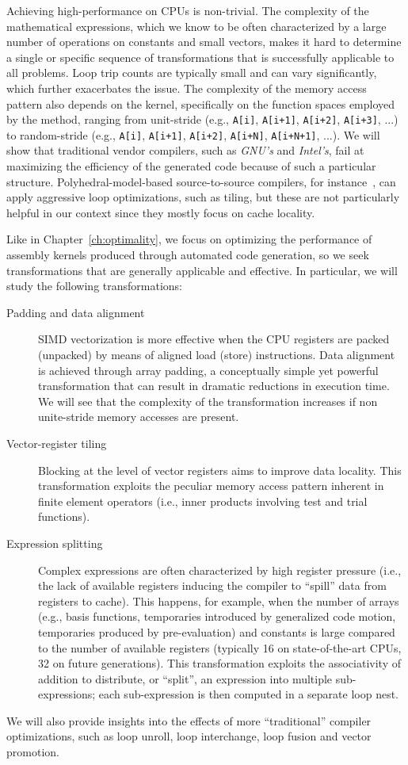 Achieving high-performance on CPUs is non-trivial. The complexity of the mathematical expressions, which we know to be often characterized by a large number of operations on constants and small vectors, makes it hard to determine a single or specific sequence of transformations that is successfully applicable to all problems. Loop trip counts are typically small and can vary significantly, which further exacerbates the issue. The complexity of the memory access pattern also depends on the kernel, specifically on the function spaces employed by the method, ranging from unit-stride (e.g., \texttt{A[i]}, \texttt{A[i+1]}, \texttt{A[i+2]}, \texttt{A[i+3]}, ...) to random-stride (e.g., \texttt{A[i]}, \texttt{A[i+1]}, \texttt{A[i+2]}, \texttt{A[i+N]}, \texttt{A[i+N+1]}, ...). We will show that traditional vendor compilers, such as \emph{GNU's} and \emph{Intel's}, fail at maximizing the efficiency of the generated code because of such a particular structure. Polyhedral-model-based source-to-source compilers, for instance~\cite{pluto}, can apply aggressive loop optimizations, such as tiling, but these are not particularly helpful in our context since they mostly focus on cache locality. 

Like in Chapter~\ref{ch:optimality}, we focus on optimizing the performance of assembly kernels produced through automated code generation, so we seek transformations that are generally applicable and effective. In particular, we will study the following transformations:
\begin{description}
\item[Padding and data alignment] SIMD vectorization is more effective when the CPU registers are packed (unpacked) by means of aligned load (store) instructions. Data alignment is achieved through array padding, a conceptually simple yet powerful transformation that can result in dramatic reductions in execution time. We will see that the complexity of the transformation increases if non unite-stride memory accesses are present.
\item[Vector-register tiling] Blocking at the level of vector registers aims to improve data locality. This transformation exploits the peculiar memory access pattern inherent in finite element operators (i.e., inner products involving test and trial functions).  
\item[Expression splitting] Complex expressions are often characterized by high register pressure (i.e., the lack of available registers inducing the compiler to ``spill'' data from registers to cache). This happens, for example, when the number of arrays (e.g., basis functions, temporaries introduced by generalized code motion, temporaries produced by pre-evaluation) and constants is large compared to the number of available registers (typically 16 on state-of-the-art CPUs, 32 on future generations). This transformation exploits the associativity of addition to distribute, or ``split'', an expression into multiple sub-expressions; each sub-expression is then computed in a separate loop nest.
\end{description}
We will also provide insights into the effects of more ``traditional'' compiler optimizations, such as loop unroll, loop interchange, loop fusion and vector promotion.

